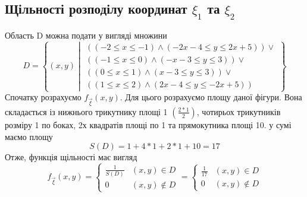 \documentclass{article}
\begin{document}
	\subsection{Щільності розподілу координат $\xi_1$ та $\xi_2$}
	Область D можна подати у вигляді множини 
	$$
	D = \left\{(x, y) \middle\vert 
	\begin{gathered}((-2\leq x \leq -1) \wedge (-2x - 4 \leq y \leq 2x+5)) \vee \\
					((-1 \leq x \leq 0) \wedge (-x-3 \leq y \leq 3)) \vee \\
					((0 \leq x \leq 1) \wedge (x-3 \leq y \leq 3))  \vee \\
					((1 \leq x \leq 2) \wedge (2x-4 \leq y \leq -2x+5)) \end{gathered} \right\}
	$$
	Спочатку розрахуємо $f_{\overrightarrow{\xi}}(x, y)$. 
	Для цього розрахуємо площу даної фігури. Вона складається із нижнього трикутнику площі 1 $\left(\frac{2 * 1}{2}\right)$, чотирьох трикутників розміру 1 по боках, 2х квадратів площі по 1 та прямокутника площі 10. у сумі маємо площу 
	$$S(D) = 1 + 4 * 1 + 2 * 1 + 10 = 17$$ 
	Отже, функція щільності має вигляд 
	$$
	f_{\overrightarrow{\xi}}(x, y) = 
	\begin{cases}
		\frac{1}{S(D)} & (x,y) \in D \\
		0 &  (x,y) \notin D
	\end{cases}
	=
		\begin{cases}
		\frac{1}{17} & (x,y) \in D \\
		0 &  (x,y) \notin D
	\end{cases}
	$$ 
	
\end{document}
